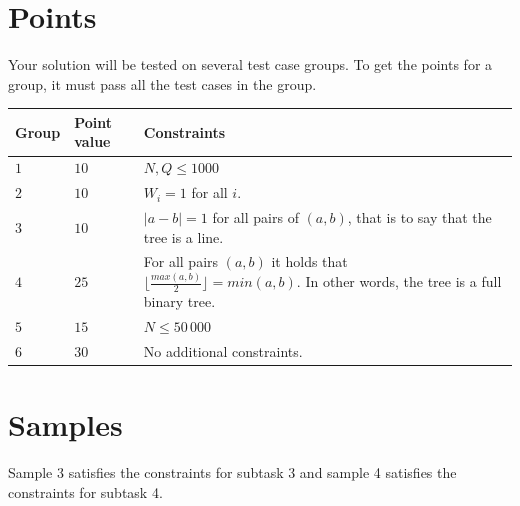 \section*{Points}
Your solution will be tested on several test case groups.
To get the points for a group, it must pass all the test cases in the group.

\noindent
\begin{tabular}{| l | l | p{12cm} |}
  \hline
  \textbf{Group} & \textbf{Point value} & \textbf{Constraints} \\ \hline
  $1$    & $10$       & $N, Q \leq 1000$ \\ \hline
  $2$    & $10$       & $W_i=1$ for all $i$. \\ \hline
  $3$    & $10$       & $|a-b|=1$ for all pairs of $(a,b)$, that is to say that the tree is a line. \\ \hline
  $4$    & $25$       & For all pairs $(a,b)$ it holds that $\lfloor\frac{max(a,b)}{2} \rfloor=min(a,b)$.
  In other words, the tree is a full binary tree. \\ \hline
  $5$    & $15$       & $N \leq 50\,000$ \\ \hline
  $6$    & $30$       & No additional constraints. \\ \hline
\end{tabular}

\section*{Samples}
Sample 3 satisfies the constraints for subtask 3 and sample 4 satisfies the constraints for subtask 4.

